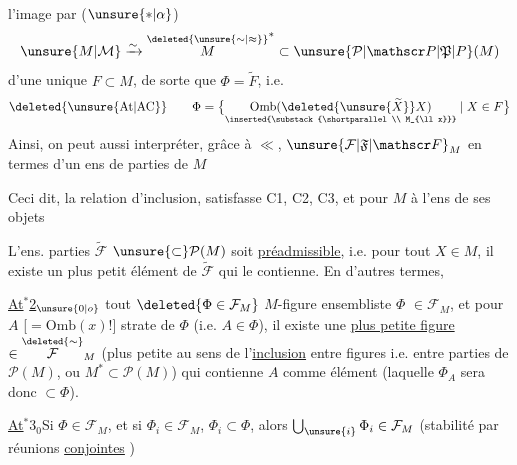 l'image par  ($\unsure{*|\alpha}$)
\[
 \unsure{M|\mathcal M}\xrightarrow{\sim}\overset{\deleted{\unsure{\sim|\approx}}}{M}^{*}\subset\unsure{\mathcal P|\mathscr P|\mathfrak P|P}(M)
\]
d'une unique  $F\subset M$, de sorte que $\Phi=\widetilde F$, i.e.
\[
 \deleted{\unsure{\mathrm{At}|\mathrm{AC}}}\qquad
 \Phi=\bigl\{\underset{\inserted{\substack{\shortparallel\\ M_{\ll x}}}}
 {\mathrm{Omb}(\deleted{\unsure{\widetilde X}}X)}\mid X\in F\bigr\}
\]
Ainsi, on peut aussi interpréter, grâce à $\ll$, $\unsure{\mathcal F|\mathfrak F|\mathscr F}_M$ en termes d'un  ens de parties  de $M$

Ceci dit,  
    la relation d'inclusion, satisfasse C1, C2, C3,
et  pour $M$  à l'ens de ses objets 

\quad {} L'ens.  parties $\widetilde{\mathcal F}$  $\unsure{\subset}\mathcal P(M)$ soit \uline{préadmissible}, i.e. pour tout $X\in M$, il existe un plus petit élément de $\widetilde{\mathcal F}$ qui le contienne. En d'autres termes,

\uline{At$^{*}$2}$_{\unsure{0|o}}$\quad
\margin{\rule{0.45pt}{4\baselineskip}}
 tout $\deleted{\Phi\in\mathcal F_M}$ $M$-figure ensembliste $\Phi$  $\in\mathcal F_M$, et pour $A$ [$=\mathrm{Omb}(x)$!]  strate de $\Phi$ (i.e. $A\in\Phi$), il existe une \uline{plus petite figure}   $\in\overset{\deleted{\sim}}{\mathcal F}_M$
(plus petite au sens de l'\uline{inclusion} \deleted{\unsure{)}} entre figures i.e. entre parties de $\mathcal P(M)$, ou  $M^{*}\subset\mathcal P(M)$) qui contienne $A$ comme élément (laquelle $\Phi_A$ sera donc $\subset\Phi$).

\uline{At$^{*}$}3$_0$\quad Si $\Phi\in\mathcal F_M$, et si  $\Phi_i\in\mathcal F_M$, $\Phi_i\subset\Phi$, alors $\bigcup_{\unsure{i}}\Phi_i\in\mathcal F_M$ (stabilité par réunions \uline{conjointes} )
